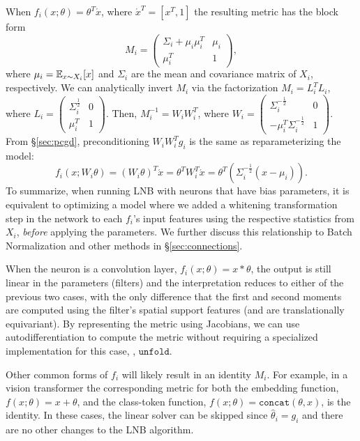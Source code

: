 When $f_i(x;\theta) = \theta^T \acute x$, where $\acute x^T = [x^T, 1]$
the resulting metric has the block form
\begin{equation}
M_i = \begin{pmatrix}
\Sigma_i + \mu_i \mu_i^T & \mu_i\\
\mu_i^T & 1
\end{pmatrix},
\end{equation}
where $\mu_i = \mathbb{E}_{x \sim X_i}[x]$ and $\Sigma_i$ are the mean and covariance matrix of $X_i$, respectively.
We can analytically invert $M_i$ via the factorization $M_i=L_i^T L_i$, where
$L_i = \begin{pmatrix}
   \Sigma_i^{\frac{1}{2}} & 0\\
   \mu_i^T & 1
\end{pmatrix}$.
Then, $M_i^{-1} = W_i W_i^T$, where
$W_i = \begin{pmatrix}
   \Sigma_i^{-\frac{1}{2}} & 0\\
   -\mu_i^T \Sigma_i^{-\frac{1}{2}} & 1
\end{pmatrix}$. From \S \ref{sec:pcgd}, preconditioning $W_iW_i^T g_i$ is the same
as reparameterizing the model:
$$
f_i(x; W_i\theta) = (W_i \theta)^T \acute x = \theta^T W_i^T \acute x = \theta^T (\Sigma_i^{-\frac{1}{2}}(x-\mu_i)).
$$
To summarize, when running LNB with neurons that have bias parameters,
it is equivalent to optimizing a model where we 
added a whitening transformation step in the network to each $f_i$'s input features using the
respective statistics from $X_i$, \emph{before} applying the parameters.
We further discuss this relationship to Batch Normalization \citep{batchnorm} and other methods in \S \ref{sec:connections}.

When the neuron is a convolution layer, $f_i(x;\theta) = x * \theta$, the output is still linear in the parameters (filters)
and the interpretation reduces to either of the previous two cases, with the only difference that the
first and second moments are computed using the filter's spatial support features (and are
translationally equivariant). By representing the metric using Jacobians, we can use autodifferentiation
to compute the metric without requiring a specialized implementation for this case, \eg, $\texttt{unfold}$.

Other common forms of $f_i$ will likely result in an identity $M_i$. For example, in a vision
transformer \citep{vit} the corresponding metric for both the embedding function, $f(x;\theta) = x + \theta$, and the class-token
function, $f(x;\theta) = \texttt{concat}(\theta, x)$, is the identity. In these cases, the linear solver can be skipped
since $\hat{\theta}_i = g_i$ and there are no other changes to the LNB algorithm.

